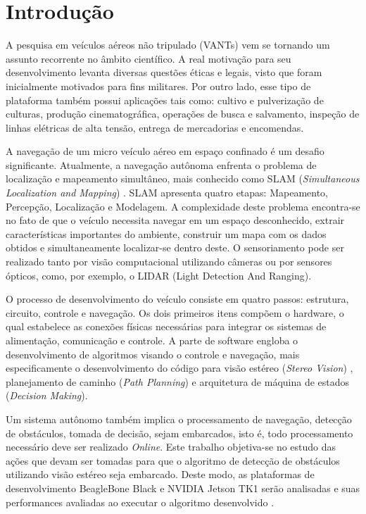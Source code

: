 \chapter{Introdução}
\label{Introducao}

A pesquisa em veículos aéreos não tripulado (VANTs) vem se tornando um assunto recorrente no âmbito científico. A real motivação para seu desenvolvimento levanta diversas questões éticas e legais, visto que foram inicialmente motivados para fins militares. Por outro lado, esse tipo de plataforma também possui aplicações tais como: cultivo e pulverização de culturas, produção cinematográfica, operações de busca e salvamento, inspeção de linhas elétricas de alta tensão, entrega de mercadorias e encomendas.

A navegação de um micro veículo aéreo em espaço confinado é um desafio significante. Atualmente, a navegação autônoma enfrenta o problema de localização e mapeamento simultâneo, mais conhecido como SLAM (\textit{Simultaneous Localization and Mapping}) \cite{Dissanayake2001}. SLAM apresenta quatro etapas: Mapeamento, Percepção, Localização e Modelagem. A complexidade deste problema encontra-se no fato de que o veículo necessita navegar em um espaço desconhecido, extrair características importantes do ambiente, construir um mapa com os dados obtidos e simultaneamente localizar-se dentro deste. O sensoriamento pode ser realizado tanto por visão computacional utilizando câmeras ou por sensores ópticos, como, por exemplo, o LIDAR (Light Detection And Ranging). 

O processo de desenvolvimento do veículo consiste em quatro passos: estrutura, circuito, controle e navegação. Os dois primeiros itens compõem o hardware, o qual estabelece as conexões físicas necessárias para integrar os sistemas de alimentação, comunicação e controle. A parte de software engloba o desenvolvimento de algoritmos visando o controle e navegação, mais especificamente o desenvolvimento do código para visão estéreo (\textit{Stereo Vision}) \cite{Lemaire2007}, planejamento de caminho (\textit{Path Planning}) e arquitetura de máquina de estados (\textit{Decision Making}).

Um sistema autônomo também implica o processamento de navegação, detecção de obstáculos, tomada de decisão, sejam embarcados, isto é, todo processamento necessário deve ser realizado \textit{Online}. Este trabalho objetiva-se no estudo das ações que devam ser tomadas para que o algoritmo de detecção de obstáculos utilizando visão estéreo seja embarcado. Deste modo, as plataformas de desenvolvimento BeagleBone Black e NVIDIA Jetson TK1 serão analisadas e suas performances avaliadas ao executar o algoritmo desenvolvido \cite{Shah2014}. 


